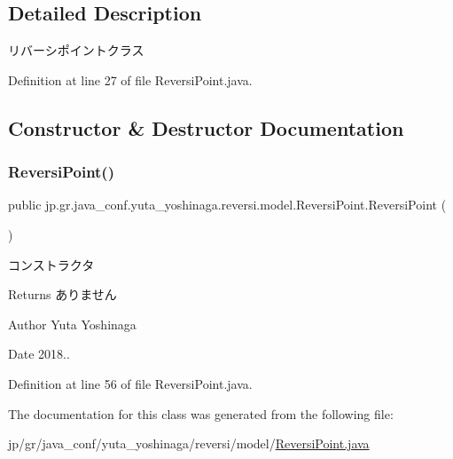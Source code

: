 \subsection{Detailed Description}
リバーシポイントクラス 

Definition at line 27 of file Reversi\+Point.\+java.



\subsection{Constructor \& Destructor Documentation}
\mbox{\label{classjp_1_1gr_1_1java__conf_1_1yuta__yoshinaga_1_1reversi_1_1model_1_1_reversi_point_a0d214a37c3858ca54e26cc6d5adb2c0b}} 
\subsubsection{\texorpdfstring{Reversi\+Point()}{ReversiPoint()}}
{\footnotesize\ttfamily public jp.\+gr.\+java\+\_\+conf.\+yuta\+\_\+yoshinaga.\+reversi.\+model.\+Reversi\+Point.\+Reversi\+Point (\begin{DoxyParamCaption}{ }\end{DoxyParamCaption})}



コンストラクタ 

\begin{DoxyReturn}{Returns}
ありません 
\end{DoxyReturn}
\begin{DoxyAuthor}{Author}
Yuta Yoshinaga 
\end{DoxyAuthor}
\begin{DoxyDate}{Date}
2018.. 
\end{DoxyDate}


Definition at line 56 of file Reversi\+Point.\+java.



The documentation for this class was generated from the following file\+:\begin{DoxyCompactItemize}
\item 
jp/gr/java\+\_\+conf/yuta\+\_\+yoshinaga/reversi/model/\mbox{\hyperlink{_reversi_point_8java}{Reversi\+Point.\+java}}\end{DoxyCompactItemize}
